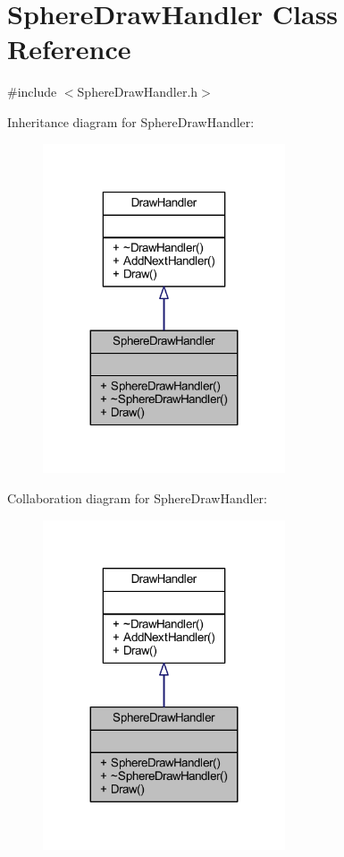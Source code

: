 \hypertarget{class_sphere_draw_handler}{}\section{Sphere\+Draw\+Handler Class Reference}
\label{class_sphere_draw_handler}


{\ttfamily \#include $<$Sphere\+Draw\+Handler.\+h$>$}



Inheritance diagram for Sphere\+Draw\+Handler\+:\nopagebreak
\begin{figure}[H]
\begin{center}
\leavevmode
\includegraphics[width=203pt]{class_sphere_draw_handler__inherit__graph}
\end{center}
\end{figure}


Collaboration diagram for Sphere\+Draw\+Handler\+:\nopagebreak
\begin{figure}[H]
\begin{center}
\leavevmode
\includegraphics[width=203pt]{class_sphere_draw_handler__coll__graph}
\end{center}
\end{figure}
